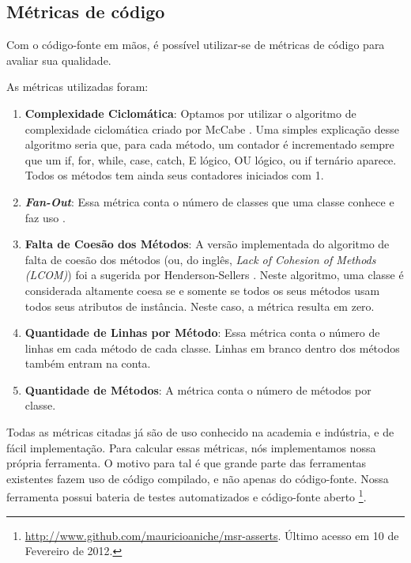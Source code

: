 \subsection{Métricas de código}

Com o código-fonte em mãos, é possível utilizar-se de métricas de código
para avaliar sua qualidade.

As métricas utilizadas foram:

\begin{enumerate}
	\item \textbf{Complexidade Ciclomática}: Optamos por utilizar o algoritmo de complexidade ciclomática criado
	por McCabe \cite{mccabe}. Uma simples explicação desse algoritmo seria que, para cada método, um contador
	é incrementado sempre que um if, for, while, case, catch, E lógico, OU lógico, ou if ternário aparece.
	Todos os métodos tem ainda seus contadores iniciados com 1. 
	
	\item \textbf{\textit{Fan-Out}}: Essa métrica conta o número de classes que uma classe conhece e faz uso \cite{lorenz}.
	
	\item \textbf{Falta de Coesão dos Métodos}: A versão implementada do algoritmo de falta de coesão dos métodos 
	(ou, do inglês, \textit{Lack of Cohesion of Methods (LCOM)}) foi a sugerida por Henderson-Sellers \cite{lcom-hs}.
	Neste algoritmo, uma classe é considerada altamente coesa se e somente se todos os seus métodos usam
	todos seus atributos de instância. Neste caso, a métrica resulta em zero. 
	
	\item \textbf{Quantidade de Linhas por Método}: Essa métrica conta o número de linhas em cada método de
	cada classe. Linhas em branco dentro dos métodos também entram na conta.
	
	\item \textbf{Quantidade de Métodos}: A métrica conta o número de métodos por classe.
	
\end{enumerate}

Todas as métricas citadas já são de uso conhecido na academia e indústria, e de fácil implementação. 
Para calcular essas
métricas, nós implementamos nossa própria ferramenta. O motivo para tal é que
grande parte das ferramentas existentes fazem uso de código compilado, e não
apenas do código-fonte. Nossa ferramenta possui bateria de testes automatizados
e código-fonte aberto \footnote{\url{http://www.github.com/mauricioaniche/msr-asserts}. 
Último acesso em 10 de Fevereiro de 2012.}.

